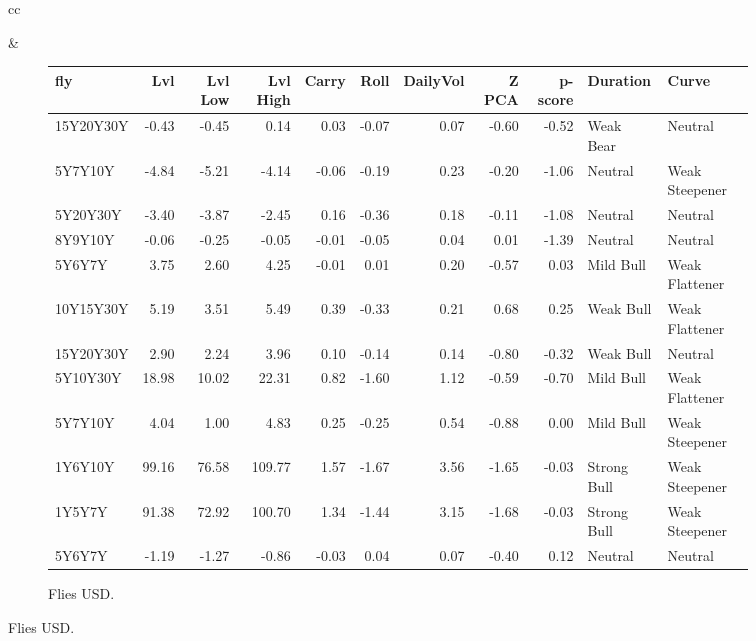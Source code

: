 \documentclass[a4paper,twoside]{report}
\begin{document}
\begin{figure}[htbp]
\begin{tabular}[c]{cc}
 
\begin{subfigure}[c]{0.5\textwidth}
 
 \end{subfigure}&
 
 \begin{subfigure}[c]{0.5\textwidth}
 \caption{Flies USD.}
 \label{fig:Flies USD}
 \begin{adjustbox}{max width=\textwidth}
 \begin{tabular}{lrrrrrrrrll}
\hline
       fly &    Lvl &  Lvl Low &  Lvl High &  Carry &  Roll &  DailyVol &  Z PCA &  p-score &     Duration &           Curve \\
\hline
 15Y20Y30Y &  -0.43 &    -0.45 &      0.14 &   0.03 & -0.07 &      0.07 &  -0.60 &    -0.52 &    Weak Bear &         Neutral \\
   5Y7Y10Y &  -4.84 &    -5.21 &     -4.14 &  -0.06 & -0.19 &      0.23 &  -0.20 &    -1.06 &      Neutral &  Weak Steepener \\
  5Y20Y30Y &  -3.40 &    -3.87 &     -2.45 &   0.16 & -0.36 &      0.18 &  -0.11 &    -1.08 &      Neutral &         Neutral \\
   8Y9Y10Y &  -0.06 &    -0.25 &     -0.05 &  -0.01 & -0.05 &      0.04 &   0.01 &    -1.39 &      Neutral &         Neutral \\
    5Y6Y7Y &   3.75 &     2.60 &      4.25 &  -0.01 &  0.01 &      0.20 &  -0.57 &     0.03 &    Mild Bull &  Weak Flattener \\
 10Y15Y30Y &   5.19 &     3.51 &      5.49 &   0.39 & -0.33 &      0.21 &   0.68 &     0.25 &    Weak Bull &  Weak Flattener \\
 15Y20Y30Y &   2.90 &     2.24 &      3.96 &   0.10 & -0.14 &      0.14 &  -0.80 &    -0.32 &    Weak Bull &         Neutral \\
  5Y10Y30Y &  18.98 &    10.02 &     22.31 &   0.82 & -1.60 &      1.12 &  -0.59 &    -0.70 &    Mild Bull &  Weak Flattener \\
   5Y7Y10Y &   4.04 &     1.00 &      4.83 &   0.25 & -0.25 &      0.54 &  -0.88 &     0.00 &    Mild Bull &  Weak Steepener \\
   1Y6Y10Y &  99.16 &    76.58 &    109.77 &   1.57 & -1.67 &      3.56 &  -1.65 &    -0.03 &  Strong Bull &  Weak Steepener \\
    1Y5Y7Y &  91.38 &    72.92 &    100.70 &   1.34 & -1.44 &      3.15 &  -1.68 &    -0.03 &  Strong Bull &  Weak Steepener \\
    5Y6Y7Y &  -1.19 &    -1.27 &     -0.86 &  -0.03 &  0.04 &      0.07 &  -0.40 &     0.12 &      Neutral &         Neutral \\

\end{tabular}
\end{adjustbox}
\end{subfigure}
\end{tabular}
\end{figure}
\end{document}
